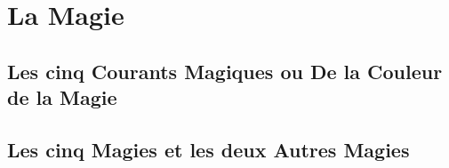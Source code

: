 \chapter{La Magie}
\section{Les cinq Courants Magiques ou De la Couleur de la Magie}
\section{Les cinq Magies et les deux Autres Magies}
